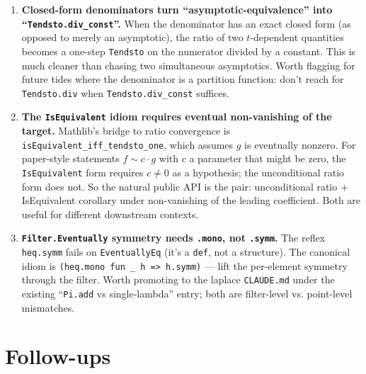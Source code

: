 \documentclass[11pt]{article}
\begin{document}
\begin{enumerate}[leftmargin=*]

\item \textbf{Closed-form denominators turn ``asymptotic-equivalence''
into ``\texttt{Tendsto.div\_const}''.} When the denominator has an exact
closed form (as opposed to merely an asymptotic), the ratio of two
$t$-dependent quantities becomes a one-step \texttt{Tendsto} on the
numerator divided by a constant. This is much cleaner than chasing
two simultaneous asymptotics. Worth flagging for future tides where
the denominator is a partition function: don't reach for \texttt{Tendsto.div}
when \texttt{Tendsto.div\_const} suffices.

\item \textbf{The \texttt{IsEquivalent} idiom requires eventual
non-vanishing of the target.} Mathlib's bridge to ratio convergence is
\texttt{isEquivalent\_iff\_tendsto\_one}, which assumes
$g$ is eventually nonzero. For paper-style statements
$f \sim c \cdot g$ with $c$ a parameter that might be zero, the
\texttt{IsEquivalent} form requires $c \neq 0$ as a hypothesis;
the unconditional ratio form does not. So the natural
public API is the pair: unconditional ratio + IsEquivalent corollary
under non-vanishing of the leading coefficient. Both are useful for
different downstream contexts.

\item \textbf{\texttt{Filter.Eventually} symmetry needs
\texttt{.mono}, not \texttt{.symm}.} The reflex
\texttt{heq.symm} fails on \texttt{EventuallyEq} (it's a \texttt{def},
not a structure). The canonical idiom is
\texttt{(heq.mono fun \_ h => h.symm)} — lift the per-element symmetry
through the filter. Worth promoting to the laplace \texttt{CLAUDE.md}
under the existing ``\texttt{Pi.add} vs single-lambda'' entry; both
are filter-level vs. point-level mismatches.

\end{enumerate}

\section{Follow-ups}
\end{document}
